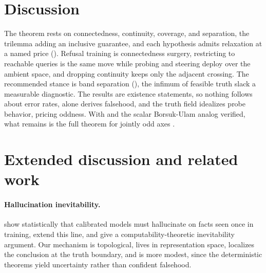 \documentclass[mlmain,onecolumn]{jmlr}
\begin{document}
\section{Discussion}
\label{sec:discussion}

The theorem rests on connectedness, continuity, coverage, and
separation, the trilemma adding an inclusive guarantee, and each
hypothesis admits relaxation at a named price
(). Refusal training is connectedness
surgery, restricting to reachable queries is the same move while
probing and steering deploy over the ambient space, and dropping
continuity keeps only the adjacent crossing. The recommended stance
is band separation (), the infimum of
feasible truth slack a measurable diagnostic. The results are
existence statements, so nothing follows about error rates,
 alone derives falsehood, and the truth
field idealizes probe behavior,  pricing
oddness. With  and the scalar
Borsuk-Ulam analog verified, what remains is the full theorem for
jointly odd axes \citep{engels2025not}.




\appendix

\section{Extended discussion and related work}
\label{app:extended}

\paragraph{Hallucination inevitability.}
\citet{kalai2024calibrated} show statistically that calibrated
models must hallucinate on facts seen once in training,
\citet{kalai2025why} extend this line, and
\citet{xu2024hallucination} give a computability-theoretic
inevitability argument. Our mechanism is topological, lives in
representation space, localizes the conclusion at the truth
boundary, and is more modest, since the deterministic theorems
yield uncertainty rather than confident falsehood.
\end{document}
